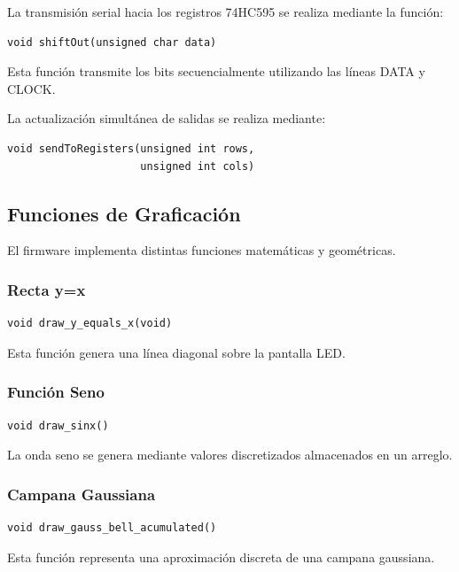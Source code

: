 La transmisión serial hacia los registros 74HC595 se realiza mediante la función:

\begin{verbatim}
void shiftOut(unsigned char data)
\end{verbatim}

Esta función transmite los bits secuencialmente utilizando las líneas DATA y CLOCK.

La actualización simultánea de salidas se realiza mediante:

\begin{verbatim}
void sendToRegisters(unsigned int rows,
                     unsigned int cols)
\end{verbatim}

\subsection{Funciones de Graficación}

El firmware implementa distintas funciones matemáticas y geométricas.

\subsubsection{Recta y=x}

\begin{verbatim}
void draw_y_equals_x(void)
\end{verbatim}

Esta función genera una línea diagonal sobre la pantalla LED.

\subsubsection{Función Seno}

\begin{verbatim}
void draw_sinx()
\end{verbatim}

La onda seno se genera mediante valores discretizados almacenados en un arreglo.

\subsubsection{Campana Gaussiana}

\begin{verbatim}
void draw_gauss_bell_acumulated()
\end{verbatim}

Esta función representa una aproximación discreta de una campana gaussiana.

